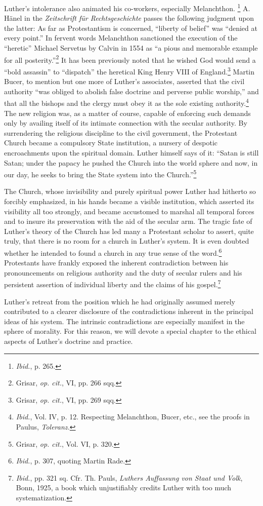 Luther’s intolerance also animated his co-workers, especially Melanchthon.
\footnote{\textit{Ibid.}, p. 265.}
A. Hänel in the \textit{Zeitschrift für Rechtsgeschichte} passes
the following judgment upon the latter: As far as Protestantism is
concerned, “liberty of belief” was “denied at every point.” In fervent
words Melanchthon sanctioned the execution of the “heretic” Michael
Servetus by Calvin in 1554 as “a pious and memorable example for
all posterity.”\footnote{Grisar, \textit{op. cit.}, VI, pp. 266 sqq.}
It has been previously noted that he wished God
would send a “bold assassin” to “dispatch” the heretical King Henry
VIII of England.\footnote{Grisar, \textit{op. cit.}, VI, pp. 269 sqq.}
Martin Bucer, to mention but one more of Luther’s
associates, asserted that the civil authority “was obliged to abolish
false doctrine and perverse public worship,” and that all the bishops
and the clergy must obey it as the sole existing authority.\footnote
{\textit{Ibid.}, Vol. IV, p. 12. Respecting Melanchthon, Bucer, etc., see the proofs in Paulus,
\textit{Toleranz.}}
The new religion was, as a matter of course, capable of enforcing
such demands only by availing itself of its intimate connection with
the secular authority. By surrendering the religious discipline to the
civil government, the Protestant Church became a compulsory State
institution, a nursery of despotic encroachments upon the spiritual
domain. Luther himself says of it: “Satan is still Satan; under the
papacy he pushed the Church into the world sphere and now, in our
day, he seeks to bring the State system into the Church.”\footnote{Grisar, \textit{op. cit.}, Vol. VI, p. 320.}

The Church, whose invisibility and purely spiritual power Luther
had hitherto so forcibly emphasized, in his hands became a visible institution,
which asserted its visibility all too strongly, and became
accustomed to marshal all temporal forces and to insure its preservation
with the aid of the secular arm. The tragic fate of Luther’s theory
of the Church has led many a Protestant scholar to assert, quite truly,
that there is no room for a church in Luther’s system. It is even
doubted whether he intended to found a church in any true sense of
the word.\footnote{\textit{Ibid.}, p. 307, quoting Martin Rade.}
Protestants have frankly exposed the inherent contradiction
between his pronouncements on religious authority and the duty
of secular rulers and his persistent assertion of individual liberty and
the claims of his gospel.\footnote
{\textit{Ibid.}, pp. 321 sq. Cfr. Th. Pauls, \textit{Luthers Auffassung von Staat und Volk}, Bonn, 1925,
a book which unjustifiably credits Luther with too much systematization.}

Luther’s retreat from the position which he had originally assumed
merely contributed to a clearer disclosure of the contradictions inherent
in the principal ideas of his system. The intrinsic contradictions
are especially manifest in the sphere of morality. For this reason,
we will devote a special chapter to the ethical aspects of Luther’s
doctrine and practice.
